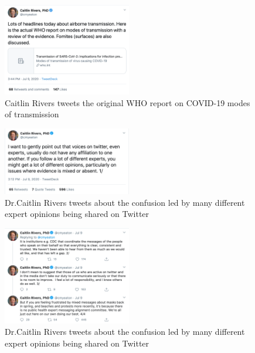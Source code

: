 \documentclass[acmsmall,authordraft]{acmart}
\begin{document}
\begin{figure}
  \includegraphics[width=0.5\textwidth]{Pictures/Appendix_Tweets/caitlin rivers tweet.png}
  \caption{Caitlin Rivers tweets the original WHO report on COVID-19 modes of transmission}
  \label{caitlin_rivers_tweet}
\end{figure}

\begin{figure}
  \includegraphics[width=0.5\textwidth]{Pictures/Appendix_Tweets/caitlin rivers tweet2.png}
  \caption{Dr.Caitlin Rivers tweets about the confusion led by many different expert opinions being shared on Twitter}
  \label{caitlin_rivers_tweet2}
\end{figure}

\begin{figure}
  \includegraphics[width=0.5\textwidth]{Pictures/Appendix_Tweets/caitlin rivers tweet2 contd.png}
  \caption{Dr.Caitlin Rivers tweets about the confusion led by many different expert opinions being shared on Twitter}
  \label{caitlin_rivers_tweet2_contd}
\end{figure}
\end{document}
